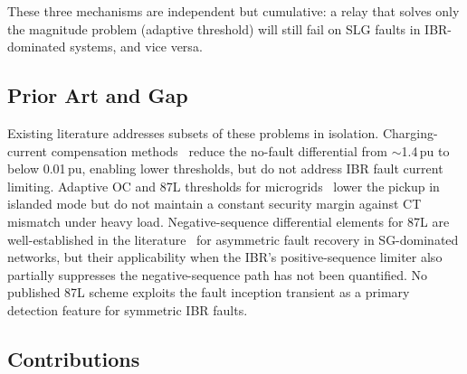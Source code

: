 \documentclass[journal,twoside,10pt]{IEEEtran}
\begin{document}
These three mechanisms are independent but cumulative: a relay that solves
only the magnitude problem (adaptive threshold) will still fail on SLG faults
in IBR-dominated systems, and vice versa.

\subsection{Prior Art and Gap}

Existing literature addresses subsets of these problems in isolation.
Charging-current compensation methods~\cite{Blackburn2006,IEEE_C37_243}
reduce the no-fault differential from $\sim$1.4\,pu to below 0.01\,pu,
enabling lower thresholds, but do not address IBR fault current limiting.
Adaptive OC and 87L thresholds for microgrids~\cite{Brahma2004,Saleh2017,
Laaksonen2017} lower the pickup in islanded mode but do not maintain a
constant security margin against CT mismatch under heavy load.
Negative-sequence differential elements for 87L are well-established in
the literature~\cite{Kasztenny2010,Anderson1999} for asymmetric fault
recovery in SG-dominated networks, but their applicability when the IBR's
positive-sequence limiter also partially suppresses the negative-sequence path
has not been quantified.  No published 87L scheme exploits the fault inception
transient as a primary detection feature for symmetric IBR faults.

\subsection{Contributions}
\end{document}
